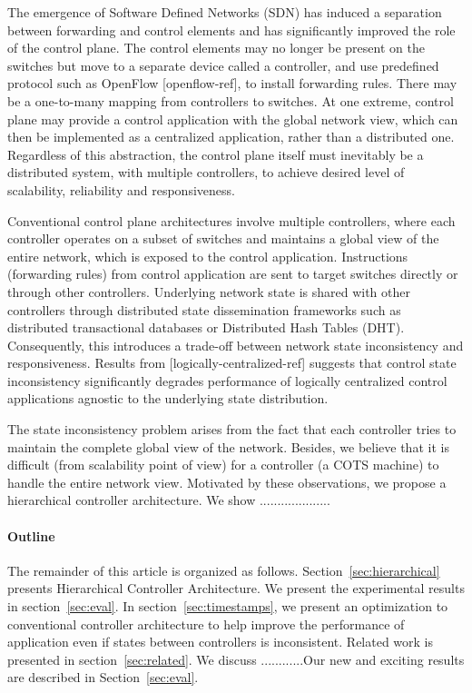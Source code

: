 \documentclass[10pt, twocolumn]{article}
\begin{document}
The emergence of Software Defined Networks (SDN) has induced a separation between forwarding and control elements and has significantly improved the role of the control plane. The control elements may no longer be present on the switches but move to a separate device called a controller, and use predefined protocol such as OpenFlow [openflow-ref], to install forwarding rules. There may be a one-to-many mapping from controllers to switches. At one extreme, control plane may provide a control application with the global network view, which can then be implemented as a centralized application, rather than a distributed one. Regardless of this abstraction, the control plane itself must inevitably be a distributed system, with multiple controllers, to achieve desired level of scalability, reliability and responsiveness.

Conventional control plane architectures involve multiple controllers, where each controller operates on a subset of switches and maintains a global view of the entire network, which is exposed to the control application. Instructions (forwarding rules) from control application are sent to target switches directly or through other controllers. Underlying network state is shared with other controllers through distributed state dissemination frameworks such as distributed transactional databases or Distributed Hash Tables (DHT). Consequently, this introduces a trade-off between network state inconsistency and responsiveness. Results from [logically-centralized-ref] suggests that control state inconsistency significantly degrades performance of logically centralized control applications agnostic to the underlying state distribution.

The state inconsistency problem arises from the fact that each controller tries to maintain the complete global view of the network. Besides, we believe that it is difficult (from scalability point of view) for a controller (a COTS machine) to handle the entire network view. Motivated by these observations, we propose a hierarchical controller architecture. We show ....................   
 

\paragraph{Outline}
The remainder of this article is organized as follows. Section~\ref{sec:hierarchical} presents Hierarchical Controller Architecture. We present the experimental results in section~\ref{sec:eval}. In section~\ref{sec:timestamps}, we present an optimization to conventional controller architecture to help improve the performance of application even if states between controllers is inconsistent. Related work is presented in section~\ref{sec:related}. We discuss ............Our new and exciting results are described in Section~\ref{sec:eval}.
\end{document}
